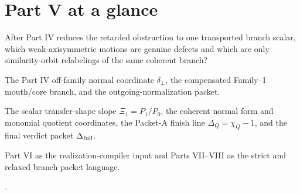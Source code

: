\section*{Part V at a glance}

\begin{readermap}
\item[Primary question] After Part IV reduces the retarded obstruction to one transported branch scalar, which weak-axisymmetric motions are genuine defects and which are only similarity-orbit relabelings of the same coherent branch?
\item[Starting inputs] The Part IV off-family normal coordinate \(\delta_\perp\), the compensated Family--1 mouth/core branch, and the outgoing-normalization packet.
\item[Delivers] The scalar transfer-shape slope \(\Xi_1=P_1/P_0\), the coherent normal form and monomial quotient coordinates, the Packet-A finish line \(\Delta_Q=\chi_Q-1\), and the final verdict packet \(\Delta_{\rm full}\).
\item[Used by] Part VI as the realization-compiler input and Parts VII--VIII as the strict and relaxed branch packet language.
\item[Result anchors] .
\end{readermap}

